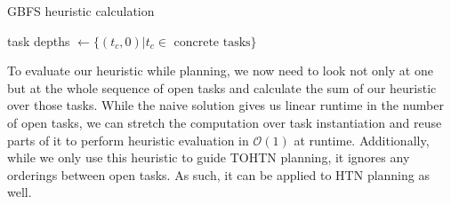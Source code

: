 \begin{algorithm}
	\caption{GBFS heuristic calculation}
	\label{algo: gbfs heuristic}
	task depths $\gets \{(t_c, 0) | t_c \in \text{ concrete tasks}\}$\;
\end{algorithm}
To evaluate our heuristic while planning, we now need to look not only at one but at the whole sequence of open tasks and calculate the sum of our heuristic over those tasks. While the naive solution gives us linear runtime in the number of open tasks, we can stretch the computation over task instantiation and reuse parts of it to perform heuristic evaluation in $\mathcal{O}(1)$ at runtime.
\cite{refer to implementation chapter - we build up the sum as we instantiate new search nodes}
Additionally, while we only use this heuristic to guide TOHTN planning, it ignores any orderings between open tasks. As such, it can be applied to HTN planning as well.

